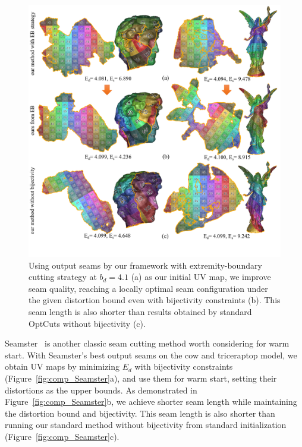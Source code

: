 \begin{figure}[!h]
\centering
\includegraphics[width=\linewidth]{fig/comp_GI_outputAsInit.png}
\caption{Using output seams by our framework with extremity-boundary cutting strategy at $b_d = 4.1$ (a) as our initial UV map, we improve seam quality, reaching a locally optimal seam configuration under the given distortion bound even with bijectivity constraints (b). This seam length is also shorter than results obtained by standard OptCuts without bijectivity (c).}
\label{fig:comp_GI_outputAsInit}
\end{figure}

Seamster~\cite{Sheffer2002Seamster} is another classic seam cutting method worth considering for warm start. With Seamster's best output seams on the cow and triceraptop model, we obtain UV maps by minimizing $E_{d}$ with bijectivity constraints (Figure~\ref{fig:comp_Seamster}a), and use them for warm start, setting their distortions as the upper bounds. As demonstrated in Figure~\ref{fig:comp_Seamster}b, we achieve shorter seam length while maintaining the distortion bound and bijectivity. This seam length is also shorter than running our standard method without bijectivity from standard initialization (Figure~\ref{fig:comp_Seamster}c).

